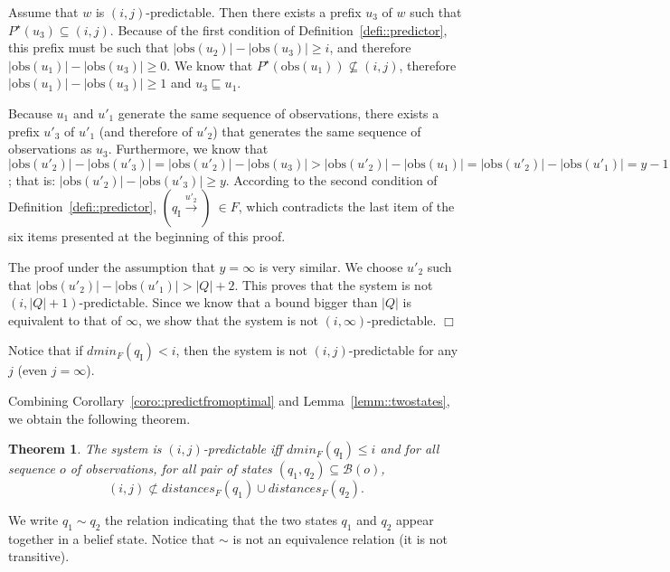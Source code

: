 \documentclass{article}
\newtheorem{theo}[lemm]{Theorem}
\newenvironment{proof}{\par\noindent{\bf Proof}}{\hspace{\stretch{1}}$\Box$}
\newcommand{\prefix}{\sqsubseteq}
\newcommand{\qi}[0]{q_{\mathrm{I}}}
\newcommand{\trans}[1]{\stackrel{#1}{\rightarrow}}
\newcommand{\obs}[0]{\mathrm{obs}}
\newcommand{\dmin}[1]{\mathit{dmin}_{#1}}
\newcommand{\distances}{\mathit{distances}_F}
\newcommand{\belief}{\mathcal{B}}
\newcommand{\optimal}[1]{{#1}^\star}
\newcommand{\optipred}{\optimal{P}}
\begin{document}
\begin{proof}
  Assume that $w$ is $(i,j)$-predictable.  
  Then there exists a prefix $u_3$ of $w$ 
  such that $\optipred(u_3) \subseteq (i,j)$.  
  Because of the first condition of Definition~\ref{defi::predictor}, 
  this prefix must be such that $|\obs(u_2)| - |\obs(u_3)| \ge i$, 
  and therefore $|\obs(u_1)| - |\obs(u_3)| \ge 0$.  
  We know that $\optipred(\obs(u_1)) \not\subseteq (i,j)$, 
  therefore $|\obs(u_1)| - |\obs(u_3)| \ge 1$ and $u_3 \prefix u_1$.  

  Because $u_1$ and $u'_1$ generate the same sequence of observations, 
  there exists a prefix $u'_3$ of $u'_1$ (and therefore of $u'_2$) 
  that generates the same sequence of observations as $u_3$.  
  Furthermore, we know that $|\obs(u'_2)| - |\obs(u'_3)| = 
  |\obs(u'_2)| - |\obs(u_3)| > |\obs(u'_2)| - |\obs(u_1)| = 
  |\obs(u'_2)| - |\obs(u'_1)| = y - 1$; 
  that is: $|\obs(u'_2)| - |\obs(u'_3)| \ge y$.  
  According to the second condition of Definition~\ref{defi::predictor}, 
  $(\qi \trans{u'_2}) \ \in F$, 
  which contradicts the last item of the six items 
  presented at the beginning of this proof.  

  The proof under the assumption that $y = \infty$ is very similar.  
  We choose $u'_2$ such that $|\obs(u'_2)| - |\obs(u'_1)| > |Q|+2$.  
  This proves that the system is not $(i,|Q|+1)$-predictable.  
  Since we know that a bound bigger than $|Q|$ is equivalent 
  to that of $\infty$, we show 
  that the system is not $(i,\infty)$-predictable.  
\end{proof}

Notice that if $\dmin{F}(\qi) < i$, 
then the system is not $(i,j)$-predictable for any $j$ 
(even $j = \infty$).  

Combining Corollary~\ref{coro::predictfromoptimal} 
and Lemma~\ref{lemm::twostates}, 
we obtain the following theorem.  

\begin{theo}\label{theo::computingpredictability}
  The system is $(i,j)$-predictable 
  iff $\dmin{F}(\qi) \le i$ and 
  for all sequence $o$ of observations, 
  for all pair of states $(q_1,q_2) \subseteq \belief(o)$, 
  \begin{displaymath}
    (i,j) \not\subset \distances(q_1) \cup \distances(q_2).  
  \end{displaymath}
\end{theo}

We write $q_1 \sim q_2$ the relation 
indicating that the two states $q_1$ and $q_2$ 
appear together in a belief state.  
Notice that $\sim$ is not an equivalence relation 
(it is not transitive).  
\end{document}

